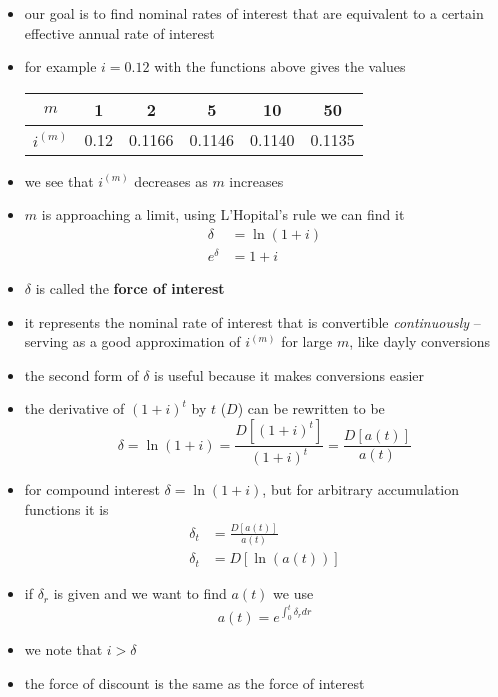 \documentclass[../00_main.tex]{subfiles}
\begin{document}
\begin{itemize}
    \item our goal is to find nominal rates of interest that are equivalent to
        a certain effective annual rate of interest
    \item for example $i=0.12$ with the functions above gives the values
        \begin{center}
            \begin{tabular}{|c|c|c|c|c|c|}\hline
                $m$     & 1     & 2     & 5     & 10    & 50    \\\hline     
                $i^{(m)}$ & 0.12& 0.1166&0.1146 & 0.1140& 0.1135\\\hline
            \end{tabular}
        \end{center}
    \item we see that $i^{(m)}$ decreases as $m$ increases
    \item $m$ is approaching a limit, using L'Hopital's rule we can find it
        \begin{equation}\nonumber
            \begin{aligned}
                \delta &= \ln{(1+i)}        \\
                e^{\delta} &= 1 + i
            \end{aligned}
        \end{equation}
    \item $\delta$ is called the \textbf{force of interest}
    \item it represents the nominal rate of interest that is convertible
        \textit{continuously} -- serving as a good approximation of $i^{(m)}$
        for large $m$, like dayly conversions
    \item the second form of $\delta$ is useful because it makes conversions
        easier
    \item the derivative of $(1+i)^t$ by $t$ ($D$) can be rewritten to be
        \begin{equation}\nonumber
            \delta = \ln{(1+i)} = \frac{D[(1+i)^t]}{(1+i)^t} = 
                \frac{D[a(t)]}{a(t)}
        \end{equation}
    \item for compound interest $\delta = \ln{(1+i)}$, but for arbitrary
        accumulation functions it is
        \begin{equation}\nonumber
            \begin{aligned}
                \delta_t &= \frac{D[a(t)]}{a(t)}     \\
                \delta_t &= D[\ln{(a(t))}]
            \end{aligned}
        \end{equation}
    \item if $\delta_r$ is given and we want to find $a(t)$ we use
        \begin{equation}\nonumber
            a(t) = e^{\int_0^t{\delta_r}{dr}}
        \end{equation}
    \item we note that $i > \delta$
    \item the force of discount is the same as the force of interest
\end{itemize}
\end{document}
